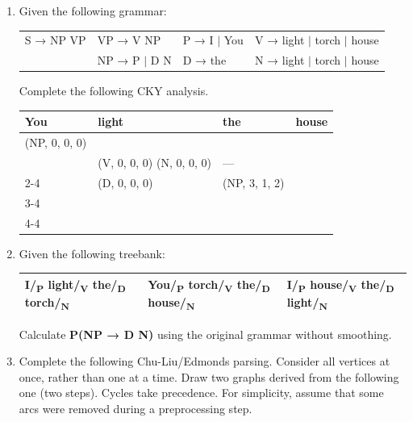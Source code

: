 \documentclass{../extra/aakpract/aakpract}
\begin{document}
	\begin{enumerate}
		\item Given the following grammar:
	\begin{center}
		\begin{tabular}{|llll|}
			\hline
			S → NP  VP & VP → V NP & P → I $|$ You & V → light $|$ torch $|$ house \\
			& NP → P $|$ D N & D → the & N → light $|$ torch $|$ house \\
			\hline
		\end{tabular}
	\end{center}
	
	Complete the following CKY analysis.
	\begin{center}\small
		\begin{tabular}{|p{2cm}|p{2cm}|p{2cm}|p{2cm}|}
			\hline
			You & light & the & house \\
			\hline
			(NP, 0, 0, 0) &&& \\
			\hline
			\multicolumn{1}{l|}{} & (V, 0, 0, 0) \newline (N, 0, 0, 0) & --- & \\
			\cline{2-4}
			\multicolumn{2}{l|}{} & (D, 0, 0, 0) & (NP, 3, 1, 2) \\
			\cline{3-4}
			\multicolumn{3}{l|}{} & \\
			\cline{4-4}
		\end{tabular}
	\end{center}
	
	\item Given the following treebank:
	\begin{center}
		\begin{tabular}{|lll|}
			\hline
			I/\textsubscript{P} light/\textsubscript{V} the/\textsubscript{D} torch/\textsubscript{N} &
			You/\textsubscript{P} torch/\textsubscript{V} the/\textsubscript{D} house/\textsubscript{N} &
			I/\textsubscript{P} house/\textsubscript{V} the/\textsubscript{D} light/\textsubscript{N} \\
			\hline
		\end{tabular}
	\end{center}
	Calculate \textbf{P(NP → D N)} using the original grammar without smoothing.
	
	\item Complete the following Chu-Liu/Edmonds parsing.
	Consider all vertices at once, rather than one at a time.
	Draw two graphs derived from the following one (two steps).
	Cycles take precedence.
	For simplicity, assume that some arcs were removed during a preprocessing step.
	

\end{enumerate}
\end{document}
